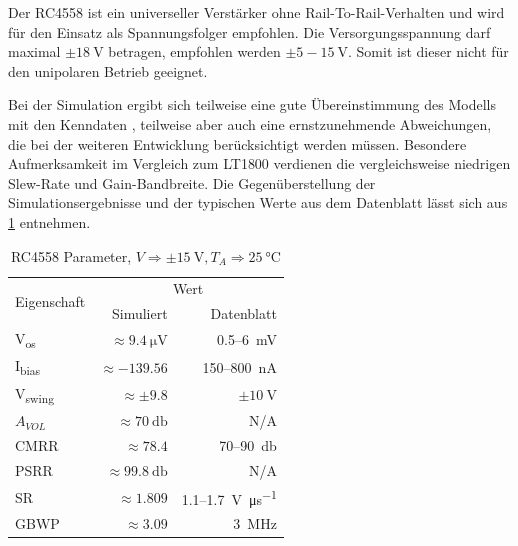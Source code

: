 \documentclass[
	ngerman,
	parskip=half,
	headsepline,
	twocolumn,
	DIV=calc,
	listof=leveldown,
	]{scrartcl}
\begin{document}
		Der RC4558 ist ein universeller Verstärker ohne Rail-To-Rail-Verhalten und wird für den Einsatz als Spannungsfolger empfohlen. 
		Die Versorgungsspannung darf maximal $ \pm\SI{18}{\volt} $ betragen, empfohlen werden $ \pm5-\SI{15}{\volt}$. Somit ist dieser nicht für den unipolaren Betrieb geeignet.
		
		Bei der Simulation ergibt sich teilweise eine gute Übereinstimmung des Modells mit den Kenndaten \cite{datasheet:RC4558}, teilweise aber auch eine ernstzunehmende Abweichungen, die bei der weiteren Entwicklung berücksichtigt werden müssen. Besondere Aufmerksamkeit im Vergleich zum LT1800 verdienen die vergleichsweise niedrigen Slew-Rate und Gain-Bandbreite. Die Gegenüberstellung der Simulationsergebnisse und der typischen Werte aus dem Datenblatt \cite{datasheet:RC4558} lässt sich aus \cref{tab:opamp-RC4558} entnehmen. 
	
		\begin{table}[h!]
			\centering
			\begin{tabular}{l r r}
				\toprule				
				\multirow{2}{*}{Eigenschaft} &
					\multicolumn{2}{c}{Wert} \\
					& Simuliert & Datenblatt \cite{datasheet:RC4558} \\
				\midrule
				
				V\textsubscript{os} 											& $ \approx \SI{9.4}{\micro\volt}  $ &  0.5--\SI{6}{\milli\volt}  \\			
				I\textsubscript{bias} 											 & $ \approx-139.56$ 		& 150--\SI{800}{\nano\ampere}  \\			
				V\textsubscript{swing} 										  & $ \approx\pm9.8$ 		 & $ \pm \SI{10}{\volt} $ \\
				 $A_{VOL}$														   & $\approx \SI{70}{\decibel}$ 		   & N/A \\
				CMRR 																  & $\approx78.4$ 		      & 70--\SI{90}{\decibel}\\
				PSRR  																   & $\approx \SI{99.8}{\decibel}$ 		   & N/A \\
				SR 																		 & $ \approx 1.809$ 		 & 1.1--\SI{1.7}{\volt\per\micro\second}\\
				GBWP 															     & $\approx 3.09$ 			  & \SI{3}{\mega\hertz}\\
				\bottomrule
			\end{tabular}
			\caption[RC4558 Parameter]{RC4558 Parameter, $V \Rightarrow \pm \SI{15}{\volt}, T_A \Rightarrow  \SI{25}{\celsius}  $}
			\label{tab:opamp-RC4558}
		\end{table}
	
\end{document}
